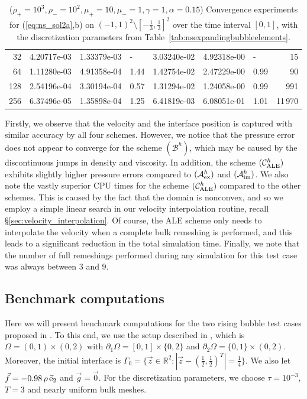 \documentclass[a4paper,12pt,onecolumn]{article}
\newcommand{\R}{\mathbb R}
\newcommand{\schemeAex}{{\mathcal{A}^h_{\rm ex}}}
\newcommand{\schemeAim}{{\mathcal{A}^h_{\rm im}}}
\newcommand{\schemeB}{{\mathcal{B}^h}}
\newcommand{\schemeALE}{{\mathcal{C}^h_{\rm ALE}}}
\newcommand{\ek}{{\rm e}}
\begin{document}
\begin{table}
\begin{tabular}{rllllllr}
 32 & 4.20717e-03 & 1.33379e-03 &    - & 3.03240e-02 & 4.92318e-00 &    - &
15 \\
 64 & 1.11280e-03 & 4.91358e-04 & 1.44 & 1.42754e-02 & 2.47229e-00 & 0.99 &
90 \\
128 & 2.54196e-04 & 3.30194e-04 & 0.57 & 1.31294e-02 & 1.24058e-00 & 0.99 &
991 \\
256 & 6.37496e-05 & 1.35898e-04 & 1.25 & 6.41819e-03 & 6.08051e-01 & 1.01 &
11\,970 \\
\hline
\end{tabular}
\hspace*{-3.25cm}
\caption[Navier--Stokes expanding bubble II errors]
{($\rho_+ = 10^3,\rho_- = 10^2,\mu_+ = 10,\mu_- =1,\gamma = 1,\alpha=0.15$)
Convergence experiments for (\ref{eq:ns_sol2a},b)
on $(-1,1)^2\setminus[-\frac{1}{3},\frac{1}{3}]^2$
over the time interval $[0,1]$, with the discretization parameters from
Table~\ref{tab:nsexpandingbubbleelements}.}
\label{tab:nsexpandingbubbleIIp2p1p0}
\end{table}%
Firstly, we observe that the velocity and the interface position is captured
with similar accuracy by all four schemes. However, we notice that the
pressure error does not appear to converge for the scheme $(\schemeB)$,
which may be caused by the discontinuous jumps in density and viscosity.
In addition, the scheme $(\schemeALE)$ exhibits slightly higher pressure
errors compared to $(\schemeAex)$ and $(\schemeAim)$.
We also note the vastly superior CPU times for the scheme $(\schemeALE)$
compared to the other schemes. This is caused by the fact that
the domain is nonconvex, and so we employ a simple linear search in
our velocity interpolation routine, recall \S\ref{sec:velocity_interpolation}.
Of course, the ALE scheme only needs to interpolate the velocity when a
complete bulk remeshing is performed, and this leads to a significant reduction
in the total simulation time. Finally, we note that the number of full
remeshings performed during any simulation for this test case was always between
3 and 9.

\subsection{Benchmark computations} \label{sec:benchmark_computations}

Here we will present benchmark computations for the two rising bubble
test cases proposed in \cite[Table~I]{HysingTKPBGT09}.
To this end, we use the setup described in
\cite[Figure~2]{HysingTKPBGT09}, which is
$\Omega = (0,1) \times (0,2)$ with $\partial_1\Omega = [0,1] \times \{0,2\}$
and $\partial_2\Omega = \{0,1\} \times (0,2)$. Moreover, the initial
interface is $\Gamma_0 = \{\vec z \in \R^2 : |\vec z - (\tfrac{1}{2},
\tfrac{1}{2})^T| = \frac{1}{4}\}$. We also let
$\vec f = -0.98\,\rho\,\vec\ek_2$ and $\vec g=\vec 0$.
For the discretization parameters, we choose
$\tau=10^{-3}$, $T=3$ and nearly uniform bulk meshes.
\end{document}
